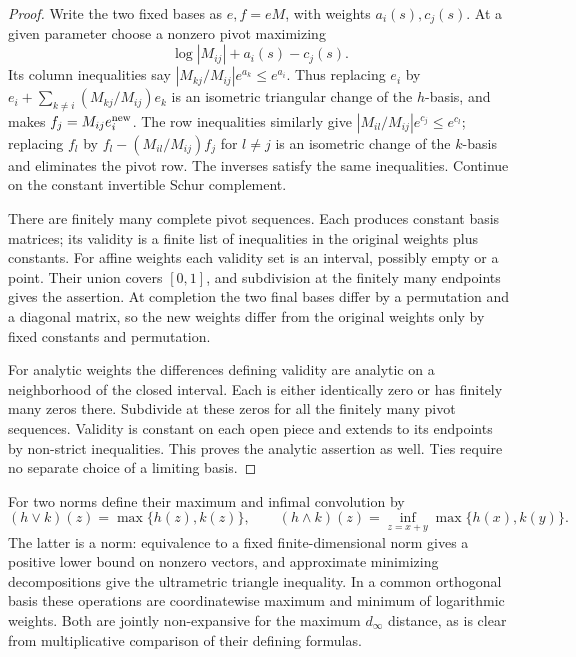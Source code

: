 \begin{proof}
Write the two fixed bases as $e,f=eM$, with weights $a_i(s),c_j(s)$.
At a given parameter choose a nonzero pivot maximizing
\[
 \log|M_{ij}|+a_i(s)-c_j(s).
\]
Its column inequalities say
$|M_{kj}/M_{ij}|e^{a_k}\le e^{a_i}$.
Thus replacing $e_i$ by
$e_i+\sum_{k\ne i}(M_{kj}/M_{ij})e_k$ is an isometric triangular
change of the $h$-basis, and makes $f_j=M_{ij}e_i^{\rm new}$.
The row inequalities similarly give
$|M_{il}/M_{ij}|e^{c_j}\le e^{c_l}$; replacing
$f_l$ by $f_l-(M_{il}/M_{ij})f_j$ for $l\ne j$ is an isometric
change of the $k$-basis and eliminates the pivot row. The inverses
satisfy the same inequalities. Continue on the constant invertible
Schur complement.

There are finitely many complete pivot sequences. Each produces
constant basis matrices; its validity is a finite list of inequalities
in the original weights plus constants. For affine weights each
validity set is an interval, possibly empty or a point. Their union
covers $[0,1]$, and subdivision at the finitely many endpoints gives
the assertion. At completion the two final bases differ by a
permutation and a diagonal matrix, so the new weights differ from
the original weights only by fixed constants and permutation.

For analytic weights the differences defining validity are analytic
on a neighborhood of the closed interval. Each is either identically
zero or has finitely many zeros there. Subdivide at these zeros for
all the finitely many pivot sequences. Validity is constant on each
open piece and extends to its endpoints by non-strict inequalities.
This proves the analytic assertion as well. Ties require no separate
choice of a limiting basis.
\end{proof}

For two norms define their maximum and infimal convolution by
\[
 (h\vee k)(z)=\max\{h(z),k(z)\},\qquad
 (h\wedge k)(z)=\inf_{z=x+y}\max\{h(x),k(y)\}.
\]
The latter is a norm: equivalence to a fixed finite-dimensional norm
gives a positive lower bound on nonzero vectors, and approximate
minimizing decompositions give the ultrametric triangle inequality.
In a common orthogonal basis these operations are coordinatewise
maximum and minimum of logarithmic weights. Both are jointly
non-expansive for the maximum $d_\infty$ distance, as is clear from
multiplicative comparison of their defining formulas.

